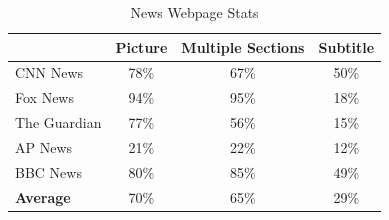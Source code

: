 \begin{table}[t]
\centering
\begin{tabular}{lccc}

& Picture & Multiple Sections & Subtitle\\
\hline \hline
CNN News & 78\% & 67\% & 50\% \\

Fox News & 94\% & 95\% & 18\% \\

The Guardian & 77\% & 56\% & 15\% \\

AP News & 21\% & 22\% & 12\% \\

BBC News & 80\% & 85\% & 49\% \\
\hline \hline
\textbf{Average} & 70\% & 65\% & 29\% \\
\end{tabular}
\caption{News Webpage Stats}
\label{table_discussion}
\end{table}
